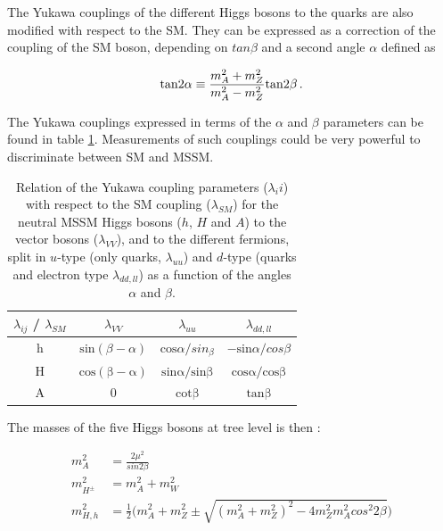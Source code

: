 The Yukawa couplings of the different Higgs bosons to the quarks are also modified with respect to the SM. They can be expressed as a correction of the coupling of the SM boson, depending on $tan \beta$ and a second angle $\alpha$ defined as 

\begin{equation}
    \mathrm{tan} 2\alpha \equiv \frac{m_{A}^2 + m_{Z}^2}{m_{A}^2 - m_{Z}^2} \mathrm{tan}2\beta \mend
\end{equation}

The Yukawa couplings expressed in terms of the $\alpha$ and $\beta$ parameters can be found in table \ref{tab:yukawaMSSM}. Measurements of such couplings could be very powerful to discriminate between SM and MSSM.

\begin{table}[]
    \centering
    \caption{Relation of the Yukawa coupling parameters ($\lambda_ii$) with respect to the SM coupling ($\lambda_{SM}$) for the neutral MSSM Higgs bosons ($h$, $H$ and $A$) to the vector bosons ($\lambda_{VV}$), and to the different fermions, split in $u$-type (only quarks, $\lambda_{uu}$) and $d$-type (quarks and electron type $\lambda_{dd,ll}$) as a function of the angles $\alpha$ and $\beta$.}
    \begin{tabular}{c c c c}
        $\lambda_{ij}$ / $\lambda_{SM}$ & $\lambda_{VV}$ & $\lambda_{uu}$ & $\lambda_{dd,ll}$ \\
        \hline
        h & $\mathrm{sin}(\beta - \alpha)$ & $\mathrm{cos}\alpha/sin_\beta$ & $-\mathrm{sin}\alpha / cos\beta$ \\
        H & $\mathrm{cos(\beta - \alpha)}$ & $\mathrm{sin\alpha / sin\beta}$ & $\mathrm{cos\alpha / cos \beta}$ \\
        A & 0 & $\mathrm{cot\beta}$ & $\mathrm{tan\beta}$ \\
        \hline
    \end{tabular}
    \label{tab:yukawaMSSM}
\end{table}

The masses of the five Higgs bosons at tree level is then :

\begin{align}
    m_{A}^2 &= \frac{2\mu^2}{sin 2\beta} \\
    m_{H^{\pm}}^2 &= m_{A}^2 + m_{W}^2 \\
    m_{H,h}^2 &= \frac{1}{2} \big( m_A^2 + m_Z^2 \pm \sqrt{(m_A^2 + m_Z^2)^2 - 4m_Z^2 m_A^2 cos^2 2\beta} \big)
\end{align}

